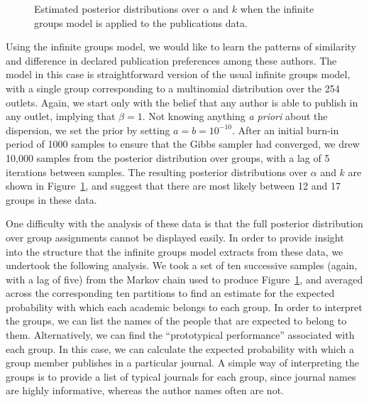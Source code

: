 \documentclass[authoryear]{elsarticle}
\newcommand{\bfc}{}
\newcommand{\efc}{\vspace*{15pt}}
\newcommand{\fcs}{}
\begin{document}
\begin{figure}[t]
\begin{center}
\caption{\bfc Estimated posterior distributions \fcs over $\alpha$ and $k$
when the infinite groups model is applied to the publications data.\efc}
\label{pubdist}
\end{center}
\end{figure}

Using the infinite groups model, we would like to learn the patterns of
similarity and difference in declared publication preferences among these
authors. The model in this case is straightforward version of the usual
infinite groups model, with a single group corresponding to a multinomial
distribution over the 254 outlets. Again, we start only with the belief that any
author is able to publish in any outlet, implying that $\beta=1$. Not knowing
anything \emph{a priori} about the dispersion, we set the prior by setting
$a=b=10^{-10}$. After an initial burn-in period of 1000 samples to ensure that
the Gibbs sampler had converged, we drew 10,000 samples from the posterior
distribution over groups, with a  lag of 5 iterations between samples. The
resulting posterior distributions over $\alpha$ and $k$ are shown in
Figure~\ref{pubdist}, and suggest that there are most likely between 12 and
17 groups in these data.

One difficulty with the analysis of these data is that the full posterior distribution over
group assignments cannot be displayed easily. In order to provide insight
into the structure that the infinite groups model extracts from these data, we
undertook the following analysis. We took a set of ten successive samples (again, with
a lag of five) from the Markov chain used to produce Figure~\ref{pubdist}, and averaged
across the corresponding ten partitions to find an estimate for the expected probability
with which each academic belongs to each group. In order to interpret the groups, we
can list the names of the people that are expected to belong to them. Alternatively, we can
find the ``prototypical performance'' associated with each group. In this case, we can
calculate the expected probability with which a group member publishes
in a particular journal. A simple way of interpreting the groups is to provide a list
of typical journals for each group,  since journal names are highly informative,
whereas the author names often are not.
\end{document}
